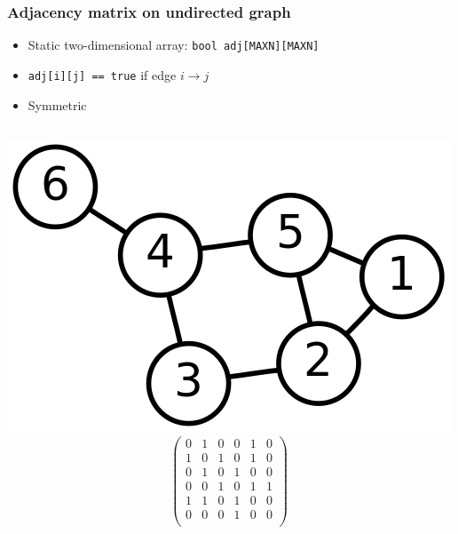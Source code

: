 \documentclass[12pt]{beamer}
\begin{document}
\begin{frame}
\frametitle{Adjacency matrix on undirected graph}
\begin{itemize}
\item Static two-dimensional array: \texttt{bool adj[MAXN][MAXN]}
\item \texttt{adj[i][j] == true} if edge $i \to j$
\item Symmetric
\end{itemize}
\begin{columns}
\flushright
\includegraphics[width=0.85\linewidth]{img/6n-graph}
\[\left(
\begin{array}{cccccc}
0&1&0&0&1&0\\
1&0&1&0&1&0\\
0&1&0&1&0&0\\
0&0&1&0&1&1\\
1&1&0&1&0&0\\
0&0&0&1&0&0\\
\end{array}
\right)\]
\end{columns}
\end{frame}
\end{document}
